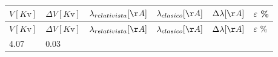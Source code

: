 \documentclass[]{article}
\begin{document}
\begin{longtable}[]{@{}llllll@{}}
\toprule
\begin{minipage}[b]{0.12\columnwidth}\raggedright
\(V[K\mathrm{v}]\)\strut
\end{minipage} & \begin{minipage}[b]{0.16\columnwidth}\raggedright
\(\Delta V [K\mathrm{v}]\)\strut
\end{minipage} & \begin{minipage}[b]{0.21\columnwidth}\raggedright
\(\lambda_{relativista} [\AA]\)\strut
\end{minipage} & \begin{minipage}[b]{0.14\columnwidth}\raggedright
\(\lambda_{clasico} [\AA]\)\strut
\end{minipage} & \begin{minipage}[b]{0.13\columnwidth}\raggedright
\(\Delta \lambda [\AA]\)\strut
\end{minipage} & \begin{minipage}[b]{0.08\columnwidth}\raggedright
\(\varepsilon\) \%\strut
\end{minipage}\tabularnewline
\midrule
\endfirsthead
\toprule
\begin{minipage}[b]{0.12\columnwidth}\raggedright
\(V[K\mathrm{v}]\)\strut
\end{minipage} & \begin{minipage}[b]{0.16\columnwidth}\raggedright
\(\Delta V [K\mathrm{v}]\)\strut
\end{minipage} & \begin{minipage}[b]{0.21\columnwidth}\raggedright
\(\lambda_{relativista} [\AA]\)\strut
\end{minipage} & \begin{minipage}[b]{0.14\columnwidth}\raggedright
\(\lambda_{clasico} [\AA]\)\strut
\end{minipage} & \begin{minipage}[b]{0.13\columnwidth}\raggedright
\(\Delta \lambda [\AA]\)\strut
\end{minipage} & \begin{minipage}[b]{0.08\columnwidth}\raggedright
\(\varepsilon\) \%\strut
\end{minipage}\tabularnewline
\midrule
\endhead
\begin{minipage}[t]{0.12\columnwidth}\raggedright
4.07\strut
\end{minipage} & \begin{minipage}[t]{0.16\columnwidth}\raggedright
0.03\strut
\end{minipage} & \begin{minipage}[t]{0.21\columnwidth}\raggedright

\end{minipage}
\end{longtable}
\end{document}
